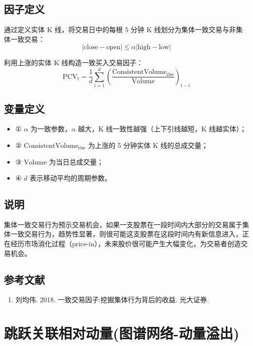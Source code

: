 \documentclass{article}
\begin{document}
\subsection{因子定义}

通过定义实体 K 线，将交易日中的每根 5 分钟 K 线划分为集体一致交易与非集体一致交易：
\begin{equation}
    |\mathrm{close} - \mathrm{open}| \leq \alpha |\mathrm{high} - \mathrm{low}|
\end{equation}

利用上涨的实体 K 线构造一致买入交易因子：
\begin{equation}
    \mathrm{PCV}_t = \frac{1}{d} \sum_{i=1}^{d} \left( \frac{\mathrm{ConsistentVolume}_{\mathrm{rise}}}{\mathrm{Volume}} \right)_{t-i}
\end{equation}

\subsection{变量定义}
\begin{itemize}
    \item ① \( \alpha \) 为一致参数，\( \alpha \) 越大，K 线一致性越强（上下引线越短，K 线越实体）；
    \item ② \( \mathrm{ConsistentVolume}_{\mathrm{rise}} \) 为上涨的 5 分钟实体 K 线的总成交量；
    \item ③ \( \mathrm{Volume} \) 为当日总成交量；
    \item ④ \( d \) 表示移动平均的周期参数。
\end{itemize}

\subsection{说明}
集体一致交易行为预示交易机会，如果一支股票在一段时间内大部分的交易属于集体一致交易行为，趋势性显著，则很可能这支股票在这段时间内有新信息进入，正在经历市场消化过程（price-in），未来股价很可能产生大幅变化，为交易者创造交易机会。

\subsection{参考文献}
\begin{enumerate}
    \item 刘均伟. 2018. 一致交易因子:挖掘集体行为背后的收益. 光大证券.
\end{enumerate}

\section{跳跃关联相对动量(图谱网络-动量溢出)}
\end{document}

